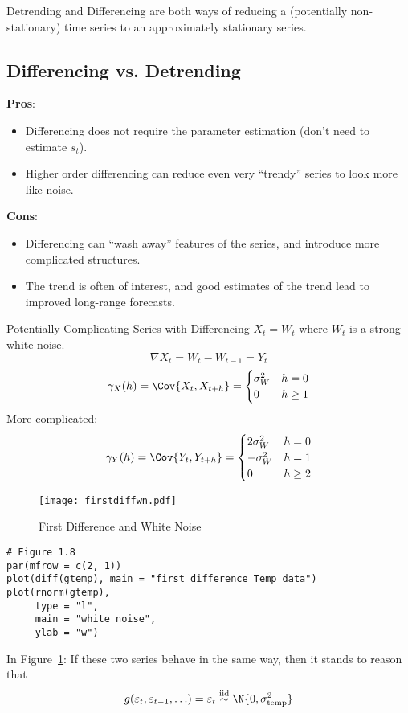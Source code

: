 Detrending and Differencing are both ways of reducing a
(potentially non-stationary) time series
to an approximately stationary series.

\subsection*{Differencing vs. Detrending}
\textbf{Pros}:
\begin{itemize}
    \item Differencing does not require the parameter estimation
          (don't need to estimate $ s_t $).
    \item Higher order differencing can reduce even very
          ``trendy'' series to look more like noise.
\end{itemize}
\textbf{Cons}:
\begin{itemize}
    \item Differencing can ``wash away'' features of the series,
          and introduce more complicated structures.
    \item The trend is often of interest, and good estimates
          of the trend lead to improved long-range forecasts.
\end{itemize}
\begin{Example}{Potentially Complicating Series with Differencing}{}
    $ X_t=W_t $ where $ W_t $ is a strong white noise.
    \[ \nabla X_t=W_t-W_{t-1}=Y_t \]
    \[ \gamma_X(h)=\Cov{X_t,X_{t+h}}=\begin{cases}
            \sigma_W^2 & h=0    \\
            0          & h\ge 1
        \end{cases} \]
    More complicated:
    \[ \gamma_Y(h)=\Cov{Y_t,Y_{t+h}}=\begin{cases}
            2\sigma_W^2 & h=0    \\
            -\sigma_W^2 & h=1    \\
            0           & h\ge 2
        \end{cases} \]
\end{Example}
\begin{figure}[!htbp]
    \centering
    \texttt{[image: firstdiffwn.pdf]}
    \caption{First Difference and White Noise}\label{fig:firstdiffwn}
\end{figure}
\begin{verbatim}
# Figure 1.8
par(mfrow = c(2, 1))
plot(diff(gtemp), main = "first difference Temp data")
plot(rnorm(gtemp),
     type = "l",
     main = "white noise",
     ylab = "w")    
\end{verbatim}
In Figure~\ref{fig:firstdiffwn}: If these two series behave in
the same way, then it stands to reason that
\[ g(\varepsilon_t,\varepsilon_{t-1},\ldots)=\varepsilon_t
    \stackrel{\text{iid}}{\sim}\N{0,\sigma^2_{\text{temp}}} \]
